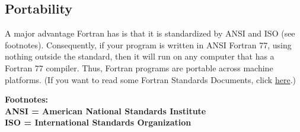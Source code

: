 \subsection*{Portability}

A major advantage Fortran has is that it is standardized by ANSI and ISO
(see footnotes). Consequently, if your program is written in ANSI
Fortran 77, using nothing outside the standard, then it will run on any
computer that has a Fortran 77 compiler. Thus, Fortran programs are
portable across machine platforms. (If you want to read some Fortran
Standards Documents, click
\href{http://www.fortran.com/fortran/stds_docs.html}{here}.)

\textbf{Footnotes: \\
ANSI = American National Standards Institute \\
ISO = International Standards Organization}
